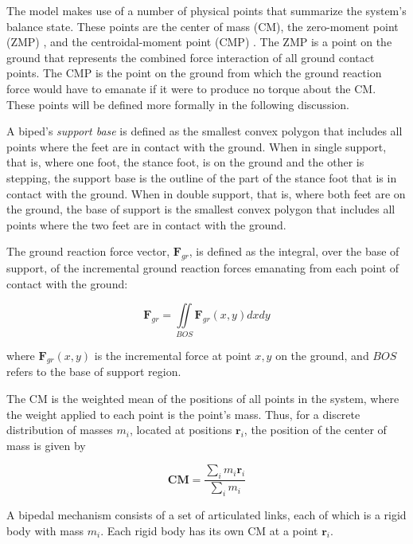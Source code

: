 \documentclass{llncs}
\begin{document}
The model makes use of a number of physical points that summarize the system’s balance state.  
These points are the center of mass (CM), the zero-moment point (ZMP) \cite{vukobratovic69},
and the centroidal-moment point (CMP) \cite{popovic2005ground}.  
The ZMP is a point on the ground that represents the combined force interaction of all ground contact points.  
The CMP is the point on the ground from which the ground reaction force would have to emanate if it were to produce no torque about the CM. 
These points will be defined more formally in the following discussion.

A biped’s \textit{support base} is defined as the smallest convex polygon that includes all points where the feet are in contact with the ground.  
When in single support, that is, where one foot, the stance foot, is on the ground and the other is stepping, the support base is the outline of the part of 
the stance foot that is in contact with the ground.  
When in double support, that is, where both feet are on the ground, the base of support is the smallest convex polygon that includes all points where the two feet are in 
contact with the ground.  

The ground reaction force vector, $\mathbf{F}_{gr}$, is defined as the integral, over the base of support, of the incremental ground reaction forces emanating from each 
point of contact with the ground:

\begin{equation}
\mathbf{F}_{gr} = \iint\limits_{BOS} \mathbf{F}_{gr} \left( x, y \right) dx dy
\label{eq:Fgr}
\end{equation}

\noindent where $\mathbf{F}_{gr} \left( x, y \right)$ is the incremental force at point $x,y$ on the ground, and $BOS$ refers to the base of support region.

The CM is the weighted mean of the positions of all points in the system, where the weight applied to each point is the point’s mass.  Thus, for a discrete distribution of masses $m_i$, located at positions $\mathbf{r}_i$, the position of the center of mass is given by

\begin{equation}
\mathbf{CM} = \frac{\sum_i m_i \mathbf{r}_i}{\sum_i m_i}
\label{eq:CM}
\end{equation}

\noindent A bipedal mechanism consists of a set of articulated links, each of which is a rigid body with mass $m_i$.
Each rigid body has its own CM at a point $\mathbf{r}_i$.
\end{document}
